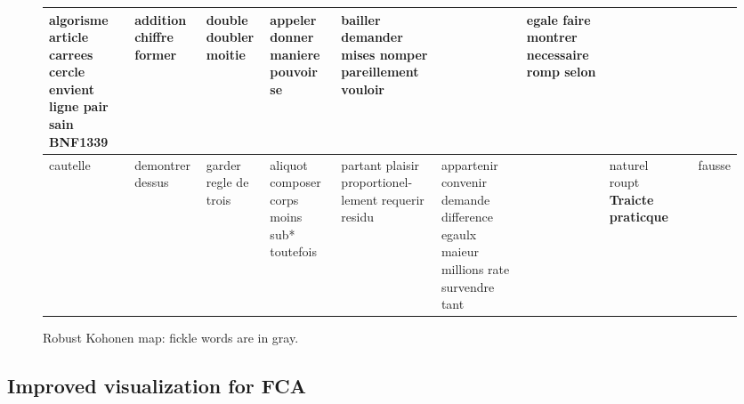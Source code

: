 \documentclass[preprint]{elsarticle}
\begin{document}
\begin{figure}[ht!]
{\begin{tabular}{|p{1.9cm}|p{1.9cm}|p{1.9cm}|p{1.9cm}|p{1.9cm}|p{1.9cm}|p{1.9cm}|p{1.9cm}|p{1.9cm}|p{1.9cm}|}
\hline
algorisme article carrees cercle envient ligne pair sain \textbf{BNF1339} & addition chiffre former &  \textcolor{gris}{double}  \textcolor{gris}{doubler} moitie & appeler  \textcolor{gris}{donner}  \textcolor{gris}{maniere}  \textcolor{gris}{pouvoir}  \textcolor{gris}{se}& bailler demander mises nomper pareillement vouloir & & egale faire montrer necessaire romp selon & & & \\
\hline
cautelle & demontrer dessus &  \textcolor{gris}{garder}  \textcolor{gris}{regle}  \textcolor{gris}{de}  \textcolor{gris}{trois} & aliquot composer corps moins sub* toutefois & partant plaisir proportionel- lement requerir residu & appartenir convenir demande difference egaulx maieur millions rate survendre tant & & naturel roupt \textbf{Traicte praticque} & & fausse\\
\hline
\end{tabular}
}
\caption{Robust Kohonen map: fickle words are in gray.}
\label{fig:koho3}
\end{figure}

\subsection{Improved visualization for FCA}
\end{document}

